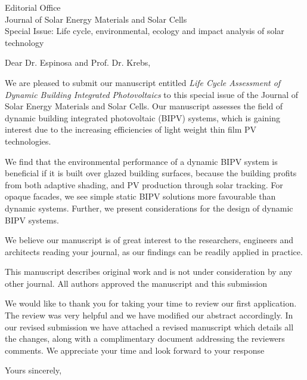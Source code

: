 \documentclass[a4paper,12pt]{letter}
\begin{document}
\begin{letter}{Editorial Office \\ Journal of Solar Energy Materials and Solar Cells\\ Special Issue: Life cycle, environmental, ecology and impact analysis of solar technology}

	\opening{Dear Dr. Espinosa and Prof. Dr. Krebs,}
	We are pleased to submit our manuscript entitled \emph{Life Cycle Assessment of Dynamic Building Integrated Photovoltaics} to this special issue of the Journal of Solar Energy Materials and Solar Cells. 
	Our manuscript assesses the field of dynamic building integrated photovoltaic (BIPV) systems, which is gaining interest due to the increasing efficiencies of light weight thin film PV technologies. 


	We find that the environmental performance of a dynamic BIPV system is beneficial if it is built over glazed building surfaces, because the building profits from both adaptive shading, and PV production through solar tracking. For opaque facades, we see simple static BIPV solutions more favourable than dynamic systems. Further, we present considerations for the design of dynamic BIPV systems.

	We believe our manuscript is of great interest to the researchers, engineers and architects reading your journal, as our findings can be readily applied in practice.

	

	
	
	

	This manuscript describes original work and is not under consideration by any other journal. All authors approved the manuscript and this submission

	We would like to thank you for taking your time to review our first application. The review was very helpful and we have modified our abstract accordingly. In our revised submission we have attached a revised manuscript which details all the changes, along with a complimentary document addressing the reviewers comments. We appreciate your time and look forward to your response


	\signature{Prageeth Jayathissa}
	\closing{Yours sincerely,}
\end{letter}

	
\end{document}
